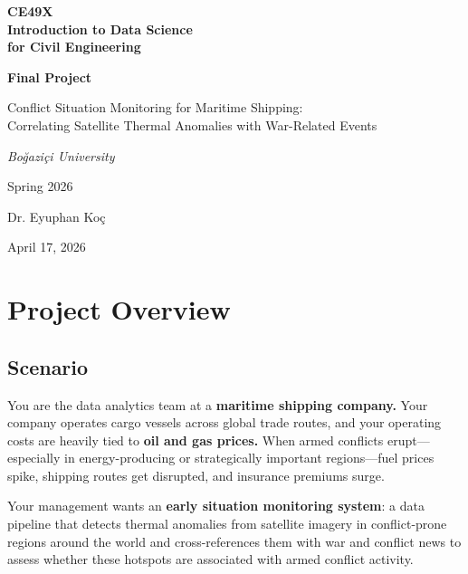 \documentclass[11pt]{article}
\title{}
\date{}
\begin{document}
\thispagestyle{empty}
\begin{center}
\vspace*{4cm}
{\Huge\bfseries CE49X\\[0.3cm]
Introduction to Data Science\\[0.2cm]
for Civil Engineering\par}

\vspace{2cm}
{\Large\bfseries Final Project\par}
\vspace{0.4cm}
{\large Conflict Situation Monitoring for Maritime Shipping:\\
Correlating Satellite Thermal Anomalies with War-Related Events\par}

\vspace{2cm}
{\large\itshape Bo\u{g}azi\c{c}i University\par}
\vspace{0.3cm}
{\large Spring 2026\par}

\vspace{1cm}
{\large Dr. Eyuphan Ko\c{c}\par}

\vfill
{\large April 17, 2026\par}
\end{center}
\newpage

\tableofcontents
\newpage

\section{Project Overview}

\subsection{Scenario}
You are the data analytics team at a \textbf{maritime shipping company.} Your company operates cargo vessels across global trade routes, and your operating costs are heavily tied to \textbf{oil and gas prices.} When armed conflicts erupt---especially in energy-producing or strategically important regions---fuel prices spike, shipping routes get disrupted, and insurance premiums surge.

Your management wants an \textbf{early situation monitoring system}: a data pipeline that detects thermal anomalies from satellite imagery in conflict-prone regions around the world and cross-references them with war and conflict news to assess whether these hotspots are associated with armed conflict activity.
\end{document}
